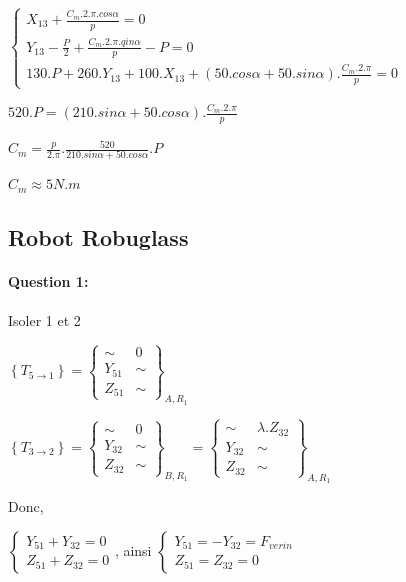 $\left\{\begin{array}{l}
X_{13}+\frac{C_m.2.\pi.cos\alpha}{p}=0 \\
Y_{13}-\frac{P}{2}+\frac{C_m.2.\pi.qin\alpha}{p}-P=0 \\
130.P+260.Y_{13}+100.X_{13}+(50.cos\alpha+50.sin\alpha).\frac{C_m.2.\pi}{p}=0
\end{array}\right.$

$520.P=(210.sin\alpha+50.cos\alpha).\frac{C_m.2.\pi}{p}$

$C_m=\frac{p}{2.\pi}.\frac{520}{210.sin\alpha+50.cos\alpha}.P$

$C_m\approx 5N.m$

\subsection{Robot Robuglass}

\paragraph{Question 1:}

Isoler 1 et 2

$\left\{T_{5\rightarrow 1}\right\}=\left\{
\begin{array}{cc}
\sim & 0 \\
Y_{51} & \sim \\
Z_{51} & \sim
\end{array}
\right\}_{A,R_1}$

$\left\{T_{3\rightarrow 2}\right\}=\left\{
\begin{array}{cc}
\sim & 0 \\
Y_{32} & \sim \\
Z_{32} & \sim
\end{array}
\right\}_{B,R_1}=\left\{
\begin{array}{cc}
\sim & \lambda.Z_{32} \\
Y_{32} & \sim \\
Z_{32} & \sim
\end{array}
\right\}_{A,R_1}$

Donc,

$\left\{\begin{array}{l}
Y_{51}+Y_{32}=0 \\
Z_{51}+Z_{32}=0
\end{array}\right.$, ainsi $\left\{\begin{array}{l}
Y_{51}=-Y_{32}=F_{verin} \\
Z_{51}=Z_{32}=0
\end{array}\right.$

